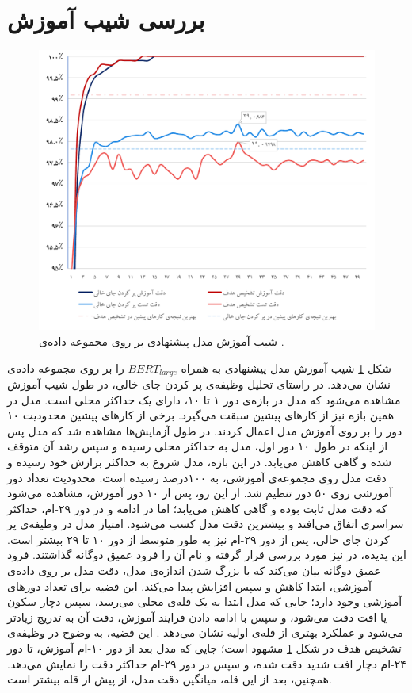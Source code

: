 \section{بررسی شیب آموزش}
\begin{figure}[!htb]
	\centering
	\includegraphics[scale=0.65]{Figures/atis_training_journey.pdf}
	\caption{شیب آموزش مدل پیشنهادی بر روی مجموعه داده‌ی .}
	\label{Fig:atis_journey}
\end{figure}
شکل \ref{Fig:atis_journey} شیب آموزش مدل پیشنهادی به همراه $BERT_{large}$ را بر روی مجموعه داده‌ی  نشان می‌دهد. در راستای تحلیل وظیفه‌ی پر کردن جای خالی، در طول شیب آموزش مشاهده می‌شود که مدل در بازه‌ی دور ۱ تا ۱۰، دارای یک حداکثر محلی است. مدل در همین بازه نیز از کارهای پیشین سبقت می‌گیرد. برخی از کار‌های پیشین محدودیت ۱۰ دور را بر روی آموزش مدل اعمال کردند. در طول آزمایش‌ها مشاهده شد که مدل پس از اینکه در طول ۱۰ دور اول، مدل به حداکثر محلی رسیده و سپس رشد آن متوقف شده و گاهی کاهش می‌یابد. در این بازه، مدل شروع به حداکثر برازش خود رسیده و دقت مدل روی مجموعه‌ی آموزشی، به ۱۰۰درصد رسیده است. محدودیت تعداد دور آموزشی روی ۵۰ دور تنظیم شد. از این رو، پس از ۱۰ دور آموزش، مشاهده می‌شود که دقت مدل ثابت بوده و گاهی کاهش می‌یابد؛ اما در ادامه و در دور ۲۹-ام، حداکثر سراسری اتفاق می‌افتد و بیشترین دقت مدل کسب می‌شود. امتیاز مدل در وظیفه‌ی پر کردن جای خالی، پس از دور ۲۹-ام نیز به طور متوسط از دور ۱۰ تا ۲۹ بیشتر است. این پدیده، در \cite{doubledescent} نیز مورد بررسی قرار گرفته و نام آن را فرود عمیق دوگانه گذاشتند. فرود عمیق دوگانه بیان می‌کند که با بزرگ شدن اندازه‌ی مدل، دقت مدل بر روی داده‌ی آموزشی، ابتدا کاهش و سپس افزایش پیدا می‌کند. این قضیه برای تعداد دورهای آموزشی وجود دارد؛ جایی که مدل ابتدا به یک قله‌ی محلی می‌رسد، سپس دچار سکون یا افت دقت می‌شود، و سپس با ادامه دادن فرایند آموزش، دقت آن به تدریج زیادتر می‌شود و عملکرد بهتری از قله‌ی اولیه نشان می‌دهد \cite{doubledescent}. این قضیه، به وضوح در وظیفه‌ی تشخیص هدف در شکل \ref{Fig:atis_journey} مشهود است؛ جایی که مدل بعد از دور ۱۰-ام آموزش، تا دور ۲۴-ام دچار افت شدید دقت شده، و سپس در دور ۲۹-ام حداکثر دقت را نمایش می‌دهد. همچنین، بعد از این قله، میانگین دقت مدل، از پیش از قله بیشتر است.
